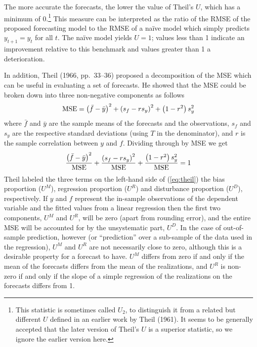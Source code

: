 The more accurate the forecasts, the lower the value of Theil's $U$,
which has a minimum of 0.\footnote{This statistic is sometimes called
  $U_2$, to distinguish it from a related but different $U$ defined in
  an earlier work by Theil (1961).  It seems to be generally accepted
  that the later version of Theil's $U$ is a superior statistic, so we
  ignore the earlier version here.} This measure can be interpreted as
the ratio of the RMSE of the proposed forecasting model to the RMSE of
a na\"ive model which simply predicts $y_{t+1} = y_t$ for all $t$.
The na\"ive model yields $U = 1$; values less than 1 indicate an
improvement relative to this benchmark and values greater than 1 a
deterioration.

In addition, Theil (1966, pp.\ 33--36) proposed a decomposition of the
MSE which can be useful in evaluating a set of forecasts.  He showed
that the MSE could be broken down into three non-negative components
as follows
%
\[
{\rm MSE} = \left(\bar{f}-\bar{y}\right)^2 + 
  \left(s_f - rs_y\right)^2 + 
  \left(1-r^2\right) s_y^2
\]
%
where $\bar{f}$ and $\bar{y}$ are the sample means of the forecasts
and the observations, $s_f$ and $s_y$ are the respective standard
deviations (using $T$ in the denominator), and $r$ is the sample
correlation between $y$ and $f$.  Dividing through by MSE we get
%
\begin{equation}
\label{eq:theil}
\frac{\left(\bar{f}-\bar{y}\right)^2}{\rm MSE} +
\frac{\left(s_f - rs_y\right)^2}{\rm MSE} + 
\frac{\left(1-r^2\right) s_y^2}{\rm MSE} = 1
\end{equation}
%
Theil labeled the three terms on the left-hand side of
(\ref{eq:theil}) the bias proportion ($U^M$), regression proportion
($U^R$) and disturbance proportion ($U^D$), respectively. If $y$ and
$f$ represent the in-sample observations of the dependent variable and
the fitted values from a linear regression then the first two
components, $U^M$ and $U^R$, will be zero (apart from rounding error),
and the entire MSE will be accounted for by the unsystematic part,
$U^D$.  In the case of out-of-sample prediction, however (or
``prediction'' over a sub-sample of the data used in the regression),
$U^M$ and $U^R$ are not necessarily close to zero, although this is a
desirable property for a forecast to have. $U^M$ differs from zero if
and only if the mean of the forecasts differs from the mean of the
realizations, and $U^R$ is non-zero if and only if the slope of a
simple regression of the realizations on the forecasts differs from
1.


